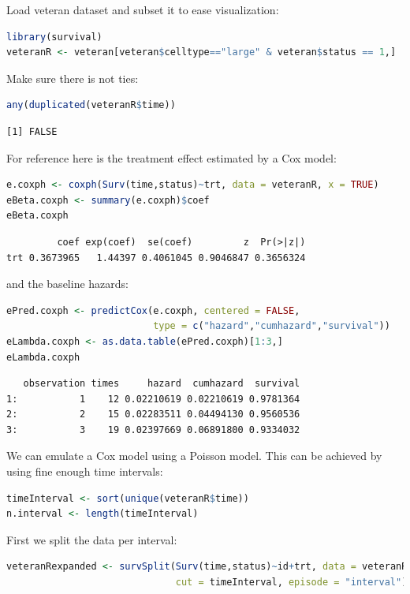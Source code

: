 \documentclass{article}
\begin{document}
Load veteran dataset and subset it to ease visualization:
\begin{lstlisting}[language=r,numbers=none]
library(survival) 
veteranR <- veteran[veteran$celltype=="large" & veteran$status == 1,]
\end{lstlisting}

Make sure there is not ties:
\begin{lstlisting}[language=r,numbers=none]
any(duplicated(veteranR$time))
\end{lstlisting}

\label{}
\begin{verbatim}
[1] FALSE
\end{verbatim}


For reference here is the treatment effect estimated by a Cox model:
\begin{lstlisting}[language=r,numbers=none]
e.coxph <- coxph(Surv(time,status)~trt, data = veteranR, x = TRUE)
eBeta.coxph <- summary(e.coxph)$coef
eBeta.coxph
\end{lstlisting}

\label{}
\begin{verbatim}
         coef exp(coef)  se(coef)         z  Pr(>|z|)
trt 0.3673965   1.44397 0.4061045 0.9046847 0.3656324
\end{verbatim}


and the baseline hazards:
\begin{lstlisting}[language=r,numbers=none]
ePred.coxph <- predictCox(e.coxph, centered = FALSE,
                          type = c("hazard","cumhazard","survival"))
eLambda.coxph <- as.data.table(ePred.coxph)[1:3,]
eLambda.coxph
\end{lstlisting}

\label{}
\begin{verbatim}
   observation times     hazard  cumhazard  survival
1:           1    12 0.02210619 0.02210619 0.9781364
2:           2    15 0.02283511 0.04494130 0.9560536
3:           3    19 0.02397669 0.06891800 0.9334032
\end{verbatim}


We can emulate a Cox model using a Poisson model. This can be achieved
by using fine enough time intervals:
\begin{lstlisting}[language=r,numbers=none]
timeInterval <- sort(unique(veteranR$time))
n.interval <- length(timeInterval)
\end{lstlisting}

First we split the data per interval:
\begin{lstlisting}[language=r,numbers=none]
veteranRexpanded <- survSplit(Surv(time,status)~id+trt, data = veteranR,
                              cut = timeInterval, episode = "interval")
\end{lstlisting}
\end{document}

